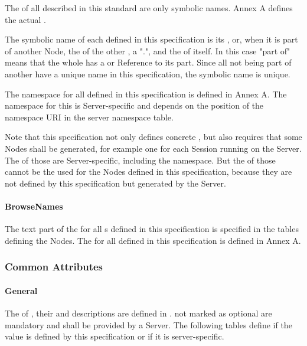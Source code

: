 The  of all  described in this standard are only symbolic names. Annex A defines the actual .

The symbolic name of each  defined in this specification is its , or, when it is part of another Node, the  of the other , a ".", and the  of itself. In this case "part of" means that the whole has a  or  Reference to its part. Since all  not being part of another  have a unique name in this specification, the symbolic name is unique.

The namespace for all  defined in this specification is defined in Annex A. The namespace for this  is Server-specific and depends on the position of the namespace URI in the server namespace table.

Note that this specification not only defines concrete , but also requires that some Nodes shall be generated, for example one for each Session running on the Server. The  of those  are Server-specific, including the namespace. But the  of those  cannot be the  used for the Nodes defined in this specification, because they are not defined by this specification but generated by the Server.

\paragraph{BrowseNames}
The text part of the  for all s defined in this specification is specified in the tables defining the Nodes. The  for all  defined in this specification is defined in Annex A.

\subsubsection{Common Attributes}

\paragraph{General}
The  of , their  and descriptions are defined in \cite{UAPart3}.  not marked as optional are mandatory and shall be provided by a Server. The following tables define if the  value is defined by this specification or if it is server-specific.

